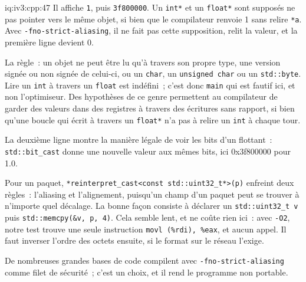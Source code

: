\begin{solution}{iq:iv3:cpp:47}
Il affiche \texttt{1}, puis \texttt{3f800000}. Un \texttt{int*} et un \texttt{float*} sont supposés ne pas pointer vers le même objet, si bien que le compilateur renvoie 1 sans relire \texttt{*a}. Avec \texttt{-fno-strict-aliasing}, il ne fait pas cette supposition, relit la valeur, et la première ligne devient 0.

La règle~: un objet ne peut être lu qu'à travers son propre type, une version signée ou non signée de celui-ci, ou un \texttt{char}, un \texttt{unsigned char} ou un \texttt{std::byte}. Lire un \texttt{int} à travers un \texttt{float} est indéfini~; c'est donc \texttt{main} qui est fautif ici, et non l'optimiseur. Des hypothèses de ce genre permettent au compilateur de garder des valeurs dans des registres à travers des écritures sans rapport, si bien qu'une boucle qui écrit à travers un \texttt{float*} n'a pas à relire un \texttt{int} à chaque tour.

La deuxième ligne montre la manière légale de voir les bits d'un flottant~: \texttt{std::bit\_cast} donne une nouvelle valeur aux mêmes bits, ici 0x3f800000 pour 1.0.

Pour un paquet, \texttt{*reinterpret\_cast<const std::uint32\_t*>(p)} enfreint deux règles~: l'aliasing et l'alignement, puisqu'un champ d'un paquet peut se trouver à n'importe quel décalage. La bonne façon consiste à déclarer un \texttt{std::uint32\_t v} puis \texttt{std::memcpy(\&v, p, 4)}. Cela semble lent, et ne coûte rien ici~: avec \texttt{-O2}, notre test trouve une seule instruction \texttt{movl (\%rdi), \%eax}, et aucun appel. Il faut inverser l'ordre des octets ensuite, si le format sur le réseau l'exige.

De nombreuses grandes bases de code compilent avec \texttt{-fno-strict-aliasing} comme filet de sécurité~; c'est un choix, et il rend le programme non portable.

\end{solution}

